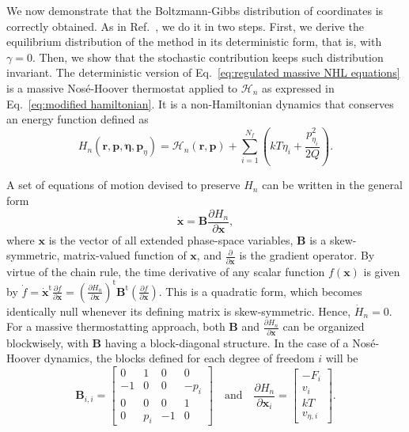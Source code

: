 \documentclass[
aip,
jcp,
reprint,
]{revtex4-1}
\newcommand{\mt}[1]{\boldsymbol{\mathbf{#1}}}          %
\newcommand{\vt}[1]{\boldsymbol{\mathbf{#1}}}          %
\newcommand{\tr}[1]{#1^\text{t}}                       %
\newcommand{\diff}[2]{\frac{\partial #2}{\partial #1}} %
\newcommand{\grad}[2]{\diff{#1}{#2}}                   %
\newcommand{\nn}{n}
\begin{document}
We now demonstrate that the Boltzmann-Gibbs distribution of coordinates is correctly obtained.
As in Ref.~, we do it in two steps.
First, we derive the equilibrium distribution of the method in its deterministic form, that is, with $\gamma=0$.
Then, we show that the stochastic contribution keeps such distribution invariant.
The deterministic version of Eq.~\eqref{eq:regulated massive NHL equations} is a massive Nos\'e-Hoover \cite{Nose_1984, Hoover_1985} thermostat applied to $\mathcal{H}_\nn$ as expressed in Eq.~\eqref{eq:modified hamiltonian}.
It is a non-Hamiltonian dynamics that conserves an energy function defined as
\begin{equation}
\label{eq:extended energy}
H_\nn(\vt r, \vt p, \vt \eta, \vt p_\eta) = {\mathcal H}_\nn(\vt r, \vt p) + \sum_{i=1}^{N_f} \left(k T \eta_i + \frac{p_{\eta_i}^2}{2 Q} \right).
\end{equation}

A set of equations of motion devised to preserve $H_\nn$ can be written in the general form \cite{Sergi_2001}
\begin{equation}
\label{eq:general conservative phase-space flow}
\dot{\vt x} = {\mt B} \grad{\vt x}{H_\nn},
\end{equation}
where $\vt x$ is the vector of all extended phase-space variables, $\mt B$ is a skew-symmetric, matrix-valued function of $\vt x$, and $\grad{\vt x}{}$ is the gradient operator.
By virtue of the chain rule, the time derivative of any scalar function $f(\vt x)$ is given by $\dot f = \tr{\dot{\vt x}}\grad{\vt x}{f} = \tr{(\grad{\vt x}{H_\nn})} \tr{\mt B} (\grad{\vt x}{f})$.
This is a quadratic form, which becomes identically null whenever its defining matrix is skew-symmetric.
Hence, $\dot{H}_\nn = 0$.
For a massive thermostatting approach, both $\mt B$ and $\grad{\vt x}{H_\nn}$ can be organized blockwisely, with $\mt B$ having a block-diagonal structure.
In the case of a Nos\'e-Hoover dynamics, the blocks defined for each degree of freedom $i$ will be
\begin{equation}
\label{eq:regulated dynamics diagonal block}
{\mt B}_{i,i} =
\left[\begin{array}{cccc}
	0  &  1  & 0  &  0   \\
	-1 &  0  & 0  & -p_i \\
	0  &  0  & 0  &  1   \\
	0  & p_i & -1 &  0
\end{array}\right]
\quad \mathrm{and} \quad
\grad{\vt x_i}{H_\nn} =
\left[\begin{array}{c}
	   -F_i    \\
	   v_i     \\
	   k T     \\
	v_{\eta,i}
\end{array}\right].
\end{equation}
\end{document}
